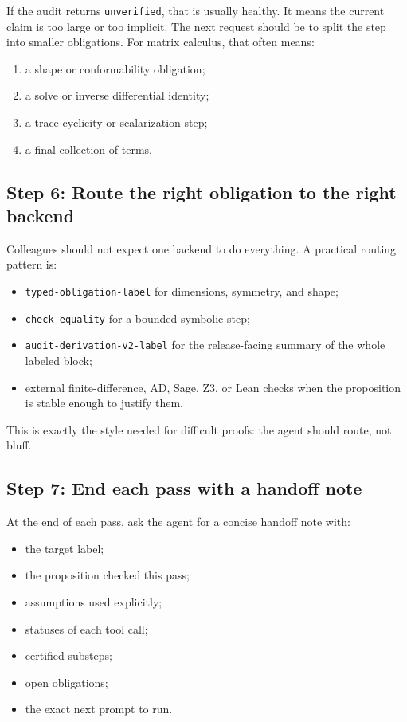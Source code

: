 \documentclass[12pt,a4paper,openany]{book}
\begin{document}
If the audit returns \texttt{unverified}, that is usually healthy. It means the
current claim is too large or too implicit. The next request should be to split
the step into smaller obligations. For matrix calculus, that often means:

\begin{enumerate}[label=\alph*.]
  \item a shape or conformability obligation;
  \item a solve or inverse differential identity;
  \item a trace-cyclicity or scalarization step;
  \item a final collection of terms.
\end{enumerate}

\subsection*{Step 6: Route the right obligation to the right backend}

Colleagues should not expect one backend to do everything. A practical routing
pattern is:

\begin{itemize}
  \item \texttt{typed-obligation-label} for dimensions, symmetry, and shape;
  \item \texttt{check-equality} for a bounded symbolic step;
  \item \texttt{audit-derivation-v2-label} for the release-facing summary of the
        whole labeled block;
  \item external finite-difference, AD, Sage, Z3, or Lean checks when the
        proposition is stable enough to justify them.
\end{itemize}

This is exactly the style needed for difficult proofs: the agent should route,
not bluff.

\subsection*{Step 7: End each pass with a handoff note}

At the end of each pass, ask the agent for a concise handoff note with:

\begin{itemize}
  \item the target label;
  \item the proposition checked this pass;
  \item assumptions used explicitly;
  \item statuses of each tool call;
  \item certified substeps;
  \item open obligations;
  \item the exact next prompt to run.
\end{itemize}
\end{document}
